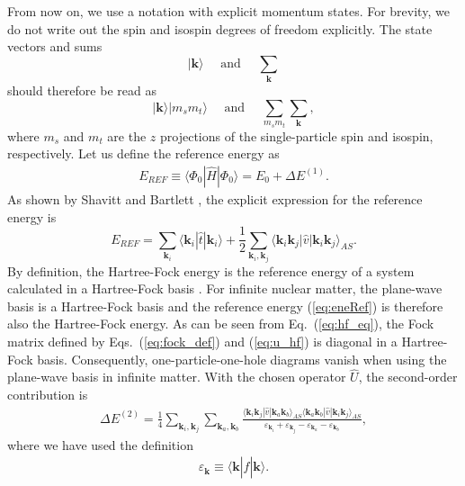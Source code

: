 \documentclass[a4paper,12pt]{report}
\begin{document}
 From now on, we use a notation with explicit momentum states. For brevity, we do not write out the spin and isospin degrees of freedom explicitly. The state vectors and sums  
\begin{equation}
  |\mathbf{k}\rangle \quad \text{ and } \quad \sum_{\mathbf{k}}
\end{equation}
should therefore be read as  
\begin{equation}
  |\mathbf{k}\rangle |m_{s}m_{t}\rangle \quad \text{ and } \quad \sum_{m_{s}m_{t}}\sum_{\mathbf{k}}, 
\end{equation}
 where $m_{s}$ and $m_{t}$ are the $z$ projections of the single-particle spin and isospin, respectively. Let us define the reference energy as
\begin{align}
  E_{REF} \equiv \langle \Phi_{0}|\hat{H}|\Phi_{0}\rangle = E_{0} + \Delta E^{(1)}.
\end{align}
As shown by Shavitt and Bartlett \cite{bartlett_book}, the explicit expression for the reference energy is 
\begin{equation} 
  E_{REF} = \sum_{\mathbf{k}_{i}}\langle \mathbf{k}_{i}|\hat{t}|\mathbf{k}_{i}\rangle + \frac{1}{2}\sum_{\mathbf{k}_{i},\mathbf{k}_{j}}\langle \mathbf{k}_{i}\mathbf{k}_{j}|\hat{v}|\mathbf{k}_{i}\mathbf{k}_{j}\rangle_{AS}. 
  \label{eq:eneRef}
\end{equation}
By definition, the Hartree-Fock energy is the reference 
energy of a system calculated in a Hartree-Fock basis 
\cite{harris}. For infinite nuclear matter, the 
plane-wave basis is a Hartree-Fock basis and the reference 
energy (\ref{eq:eneRef}) is therefore also the Hartree-Fock 
energy. As can be seen from Eq.~(\ref{eq:hf_eq}), the Fock 
matrix defined by Eqs.~(\ref{eq:fock_def}) and 
(\ref{eq:u_hf}) is diagonal in a Hartree-Fock basis. 
Consequently, one-particle-one-hole diagrams vanish when
using the plane-wave basis in infinite matter. 
With the chosen operator $\hat{U}$, the second-order 
contribution is
\begin{align} 
  \Delta E^{(2)} = \frac{1}{4}\sum_{\mathbf{k}_{i},\mathbf{k}_{j}}\sum_{\mathbf{k}_{a},\mathbf{k}_{b}}\frac{\langle \mathbf{k}_{i}\mathbf{k}_{j}|\hat{v}|\mathbf{k}_{a}\mathbf{k}_{b}\rangle_{AS} \langle \mathbf{k}_{a}\mathbf{k}_{b}|\hat{v}|\mathbf{k}_{i}\mathbf{k}_{j}\rangle_{AS}}{\varepsilon_{\mathbf{k}_{i}}+\varepsilon_{\mathbf{k}_{j}}-\varepsilon_{\mathbf{k}_{a}}-\varepsilon_{\mathbf{k}_{b}}},
  \label{eq:enePt2}
\end{align}
where we have used the definition 
\begin{align}
  \varepsilon_{\mathbf{k}} \equiv \langle \mathbf{k}|\hat{f}|\mathbf{k}\rangle . 
  \label{eq:sp_pot_def}
\end{align}
\end{document}
